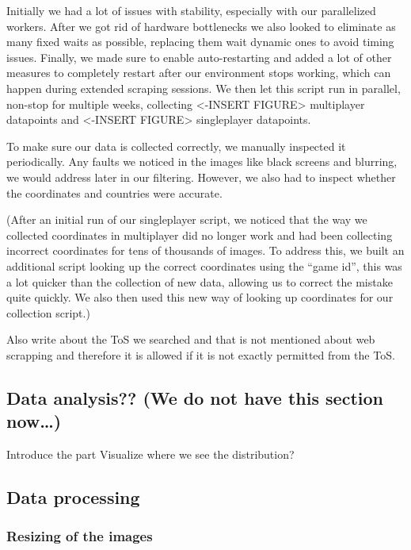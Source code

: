 \documentclass{article}
\begin{document}
Initially we had a lot of issues with stability, especially with our
parallelized workers. After we got rid of hardware bottlenecks we also
looked to eliminate as many fixed waits as possible, replacing them wait
dynamic ones to avoid timing issues. Finally, we made sure to enable
auto-restarting and added a lot of other measures to completely restart
after our environment stops working, which can happen during extended
scraping sessions. We then let this script run in parallel, non-stop for
multiple weeks, collecting \textless-INSERT FIGURE\textgreater{}
multiplayer datapoints and \textless-INSERT FIGURE\textgreater{}
singleplayer datapoints.

To make sure our data is collected correctly, we manually inspected it
periodically. Any faults we noticed in the images like black screens and
blurring, we would address later in our filtering. However, we also had
to inspect whether the coordinates and countries were accurate.

(After an initial run of our singleplayer script, we noticed that the
way we collected coordinates in multiplayer did no longer work and had
been collecting incorrect coordinates for tens of thousands of images.
To address this, we built an additional script looking up the correct
coordinates using the ``game id'', this was a lot quicker than the
collection of new data, allowing us to correct the mistake quite
quickly. We also then used this new way of looking up coordinates for
our collection script.)

Also write about the ToS we searched and that is not mentioned about web
scrapping and therefore it is allowed if it is not exactly permitted
from the ToS.

\subsection{Data analysis?? (We do not have this section
now\ldots)}\label{data-analysis-we-do-not-have-this-section-now}

Introduce the part Visualize where we see the distribution?

\subsection{Data processing}\label{data-processing}

\subsubsection{Resizing of the images}\label{resizing-of-the-images}
\end{document}
